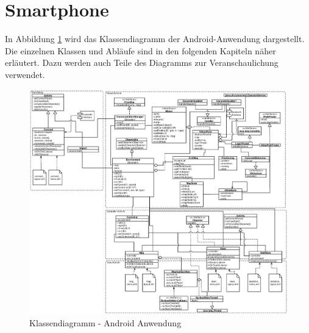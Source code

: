 \documentclass[10pt,a4paper]{article}
\begin{document}
		\section{Smartphone}
			In Abbildung \ref{fig:klassendiagramm} wird das Klassendiagramm der Android-Anwendung dargestellt. Die einzelnen Klassen und Abläufe
			sind in den folgenden Kapiteln näher erläutert. Dazu werden auch Teile des Diagramms zur Veranschaulichung verwendet. \\
			\begin{figure}[p]
				\centering
				\includegraphics[width=18cm, angle=90]{images/android_klassendiagramm.eps}
  				\caption{Klassendiagramm - Android Anwendung}
  				\label{fig:klassendiagramm}
  			\end{figure}	
\end{document}
